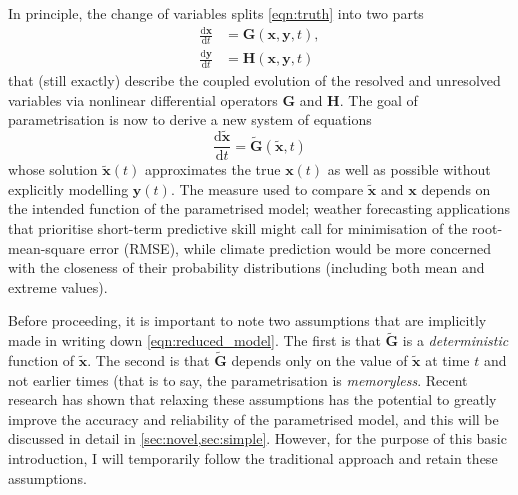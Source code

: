 \documentclass[titlepage,twoside]{article}
\numberwithin{equation}{section}
\newcommand{\diff}[2]{\frac{\mathrm{d} #1}{\mathrm{d} #2}}
\renewcommand\vec{\bm}
\begin{document}
In principle, the change of variables splits \cref{eqn:truth}
into two parts
\begin{align*}
    \diff{\vec{x}}{t} &= \vec{G}(\vec{x},\vec{y},t), \\
    \diff{\vec{y}}{t} &= \vec{H}(\vec{x},\vec{y},t)
\end{align*}
that (still exactly) describe the coupled evolution of the resolved and
unresolved variables via nonlinear differential operators $\vec{G}$ and
$\vec{H}$. The goal of parametrisation is now to derive a new system of
equations
\begin{equation} \label{eqn:reduced_model}
    \diff{\tilde{\vec{x}}}{t} = \tilde{\vec{G}}(\tilde{\vec{x}},t)
\end{equation}
whose solution $\tilde{\vec{x}}(t)$ approximates the true $\vec{x}(t)$ as well
as possible without explicitly modelling $\vec{y}(t)$. The measure used to
compare $\tilde{\vec{x}}$ and $\vec{x}$ depends on the intended function of the
parametrised model; weather forecasting applications that prioritise short-term
predictive skill might call for minimisation of the root-mean-square error
(RMSE), while climate prediction would be more concerned with the closeness of
their probability distributions (including both mean and extreme values).

Before proceeding, it is important to note two assumptions that are implicitly
made in writing down \cref{eqn:reduced_model}. The first is that
$\tilde{\vec{G}}$ is a \emph{deterministic} function of $\tilde{\vec{x}}$. The
second is that $\tilde{\vec{G}}$ depends only on the value of $\tilde{\vec{x}}$
at time $t$ and not earlier times (that is to say, the parametrisation is
\emph{memoryless}. Recent research has shown that relaxing these assumptions
has the potential to greatly improve the accuracy and reliability of the
parametrised model, and this will be discussed in detail in
\cref{sec:novel,sec:simple}. However, for the purpose of this basic
introduction, I will temporarily follow the traditional approach and retain
these assumptions.
\end{document}
